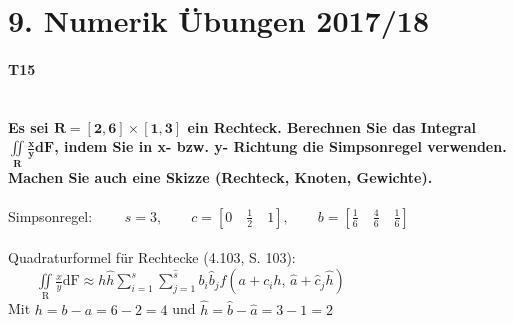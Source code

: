 \documentclass[10pt,a4paper]{article}
\begin{document}

	\section*{9. Numerik Übungen 2017/18}
	\paragraph{T15}\mbox{}\\
	\textbf{%
		Es sei $\mathbf{R = [2,6]\times[1,3]}$ ein Rechteck. Berechnen Sie das Integral $\mathbf{\iint\limits_\text{R}\frac{x}{y}dF}$, indem Sie in x- bzw. y- Richtung die Simpsonregel verwenden. Machen Sie auch eine Skizze (Rechteck, Knoten, Gewichte).
	}\\\\
	Simpsonregel: $\qquad s=3, \qquad c=\left[ 0 \quad \frac{1}{2} \quad 1\right] , \qquad b=\left[ \frac{1}{6}\quad \frac{4}{6}\quad \frac{1}{6}\right] $ \\\\
	Quadraturformel für Rechtecke (4.103, S. 103):$ \qquad
		\iint\limits_\text{R}\frac{x}{y}\text{dF} \approx h\hat{h}\sum\limits_{i=1}^{s} \sum\limits_{j=1}^{\hat{s}}b_i\hat{b}_jf(a+c_ih,\,\hat{a}+\hat{c}_j\hat{h})$ \\
	Mit $h=b-a=6-2=4$ und $\hat{h}=\hat{b}-\hat{a}=3-1=2$  \\
\end{document}
